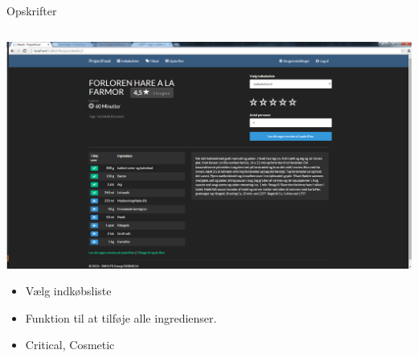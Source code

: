 \begin{frame}{Opskrifter}

	
	\begin{minipage}[0.3\textheight]{\textwidth}
	\begin{columns}[T]
	\begin{column}{1\textwidth}
	 \includegraphics[width=1\textwidth,height=1\textheight,keepaspectratio, trim={1cm 0 0 16mm}, clip]{images/Screenshots/PickedRecipeOld.png}
	 
		\begin{itemize}
		\item Vælg indkøbsliste
		\item Funktion til at tilføje alle ingredienser.
		\item Critical, Cosmetic
		\end{itemize}
	\end{column}

	\end{columns}

  \end{minipage}
	
\end{frame}
